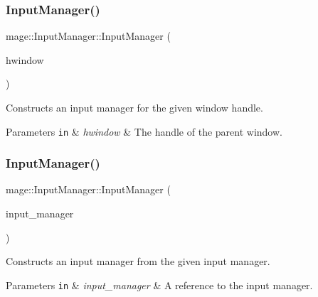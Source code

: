 \subsubsection{\texorpdfstring{Input\+Manager()}{InputManager()}\hspace{0.1cm}{\footnotesize\ttfamily [1/3]}}
{\footnotesize\ttfamily mage\+::\+Input\+Manager\+::\+Input\+Manager (\begin{DoxyParamCaption}\item[{H\+W\+ND}]{hwindow }\end{DoxyParamCaption})\hspace{0.3cm}{\ttfamily [explicit]}}

Constructs an input manager for the given window handle.


\begin{DoxyParams}[1]{Parameters}
\mbox{\tt in}  & {\em hwindow} & The handle of the parent window. \\
\hline
\end{DoxyParams}
\hypertarget{classmage_1_1_input_manager_a68503617f418bf270dc39bb18019b46d}{}\label{classmage_1_1_input_manager_a68503617f418bf270dc39bb18019b46d} 
\subsubsection{\texorpdfstring{Input\+Manager()}{InputManager()}\hspace{0.1cm}{\footnotesize\ttfamily [2/3]}}
{\footnotesize\ttfamily mage\+::\+Input\+Manager\+::\+Input\+Manager (\begin{DoxyParamCaption}\item[{const \hyperlink{classmage_1_1_input_manager}{Input\+Manager} \&}]{input\+\_\+manager }\end{DoxyParamCaption})\hspace{0.3cm}{\ttfamily [delete]}}

Constructs an input manager from the given input manager.


\begin{DoxyParams}[1]{Parameters}
\mbox{\tt in}  & {\em input\+\_\+manager} & A reference to the input manager. \\
\hline
\end{DoxyParams}
\hypertarget{classmage_1_1_input_manager_a93de208333f18b4c61ec72d0a28d0d51}{}\label{classmage_1_1_input_manager_a93de208333f18b4c61ec72d0a28d0d51} 
